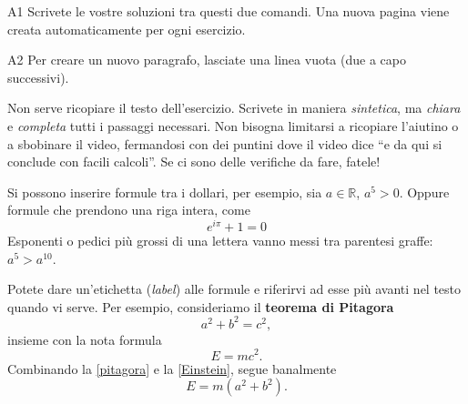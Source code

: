\documentclass{stagetex}
\begin{document}
\begin{soluzione}{A1}
 Scrivete le vostre soluzioni tra questi due comandi. Una nuova pagina viene creata automaticamente per ogni esercizio.
\end{soluzione}

\begin{soluzione}{A2}
Per creare un nuovo paragrafo, lasciate una linea vuota (due a capo successivi).
 
Non serve ricopiare il testo dell'esercizio. 
Scrivete in maniera \emph{sintetica}, ma \emph{chiara} e \emph{completa}
tutti i passaggi necessari. Non bisogna limitarsi a ricopiare l'aiutino o a
sbobinare il video, fermandosi con dei puntini dove il video dice ``e da
qui si conclude con facili calcoli''. Se ci sono delle verifiche da fare, fatele!

Si possono inserire formule tra i dollari, per esempio, sia $a\in\mathbb{R}$, $a^5>0$. Oppure formule che prendono una riga intera,
come
\begin{equation}
    e^{i\pi}+1=0
\end{equation}
Esponenti o pedici più grossi di una lettera vanno messi tra parentesi graffe: $a^5 > a^{10}$.

Potete dare un'etichetta (\emph{label}) alle formule e riferirvi ad esse più avanti nel testo quando vi serve. Per esempio, consideriamo il \textbf{teorema di Pitagora}
\begin{equation}
 a^2+b^2=c^2, \label{pitagora}
\end{equation}
insieme con la nota formula
\begin{equation}
E=mc^2. \label{Einstein}
\end{equation}
Combinando la \eqref{pitagora} e la \eqref{Einstein}, segue banalmente
\begin{equation}
 E=m(a^2+b^2).
\end{equation}

\end{soluzione}
\end{document}
